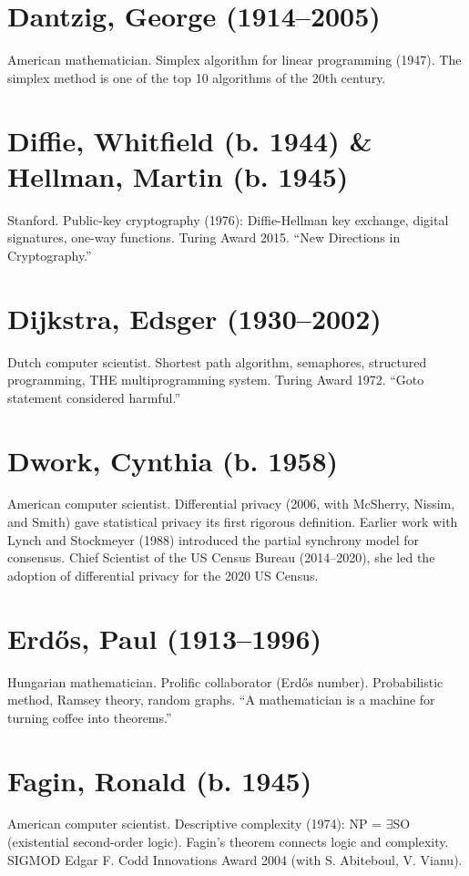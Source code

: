 \section*{Dantzig, George (1914--2005)}
American mathematician. Simplex algorithm for linear programming (1947). The simplex method is one of the top 10 algorithms of the 20th century.

\section*{Diffie, Whitfield (b. 1944) \& Hellman, Martin (b. 1945)}
Stanford. Public-key cryptography (1976): Diffie-Hellman key exchange, digital signatures, one-way functions. Turing Award 2015. ``New Directions in Cryptography.''

\section*{Dijkstra, Edsger (1930--2002)}
Dutch computer scientist. Shortest path algorithm, semaphores, structured programming, THE multiprogramming system. Turing Award 1972. ``Goto statement considered harmful.''

\section*{Dwork, Cynthia (b. 1958)}
American computer scientist. Differential privacy (2006, with McSherry, Nissim, and Smith) gave statistical privacy its first rigorous definition. Earlier work with Lynch and Stockmeyer (1988) introduced the partial synchrony model for consensus. Chief Scientist of the US Census Bureau (2014--2020), she led the adoption of differential privacy for the 2020 US Census.

\section*{Erdős, Paul (1913--1996)}
Hungarian mathematician. Prolific collaborator (Erdős number). Probabilistic method, Ramsey theory, random graphs. ``A mathematician is a machine for turning coffee into theorems.''

\section*{Fagin, Ronald (b. 1945)}
American computer scientist. Descriptive complexity (1974): NP = $\exists$SO (existential second-order logic). Fagin's theorem connects logic and complexity. SIGMOD Edgar F. Codd Innovations Award 2004 (with S. Abiteboul, V. Vianu).


